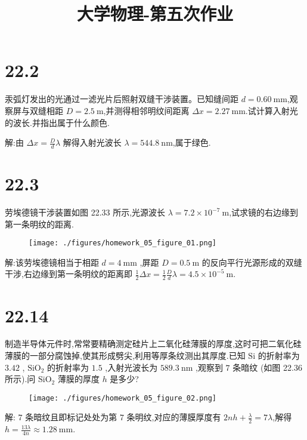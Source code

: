 
\usepackage{../../homeworks_preamble}
\title{大学物理-第五次作业}


    \maketitle
    \section{22.2} 汞弧灯发出的光通过一滤光片后照射双缝干涉装置。已知缝间距 $d=0.60 \ \mathrm{mm}$,观察屏与双缝相距 $D=2.5 \ \mathrm{m}$,并测得相邻明纹间距离 $\Delta x=2.27 \ \mathrm{mm}$.试计算入射光的波长.并指出属于什么颜色.

    解:由 $\Delta x=\frac{D}{d}\lambda$ 解得入射光波长 $\lambda=544.8 \ \mathrm{nm}$,属于绿色.
    \section{22.3} 劳埃德镜干涉装置如图 22.33 所示,光源波长 $\lambda=7.2\times 10^{-7} \ \mathrm{m}$,试求镜的右边缘到第一条明纹的距离.

    \begin{figure}[htbp]
        \centering
        \texttt{[image: ./figures/homework\_05\_figure\_01.png]}
    \end{figure}

    解:该劳埃德镜相当于相距 $d=4 \ \mathrm{mm}$ ,屏距 $D=0.5 \ \mathrm{m}$ 的反向平行光源形成的双缝干涉,右边缘到第一条明纹的距离即 $\frac{1}{2}\Delta x=\frac{1}{2}\frac{D}{d}\lambda=4.5\times 10^{-5} \ \mathrm{m}$.
    \section{22.14} 制造半导体元件时,常常要精确测定硅片上二氧化硅薄膜的厚度,这时可把二氧化硅薄膜的一部分腐蚀掉,使其形成劈尖,利用等厚条纹测出其厚度.已知 $\mathrm{Si}$ 的折射率为 $3.42$ , $\mathrm{SiO_2}$ 的折射率为 $1.5$ ,入射光波长为 $589.3 \ \mathrm{nm}$ ,观察到 $7$ 条暗纹 (如图 22.36 所示).问 $\mathrm{SiO_2}$ 薄膜的厚度 $h$ 是多少?

    \begin{figure}[htbp]
        \centering
        \texttt{[image: ./figures/homework\_05\_figure\_02.png]}
    \end{figure}
    
    解: $7$ 条暗纹且即标记处处为第 $7$ 条明纹,对应的薄膜厚度有 $2nh+\frac{\lambda}{2}=7\lambda$,解得 $h=\frac{13\lambda}{4n}\approx 1.28 \ \mathrm{mm}$.
